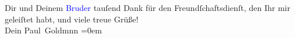 \pstart
           Dir und Deinem \textcolor{blue}{Bruder}{}\ledrightnote{\textcolor{blue}{Julius Schnitzler}} tauſend Dank für
               den Freundſchaftsdienſt, den Ihr mir geleiſtet habt, und viele treue Grüße! {\\[\baselineskip]}Dein
                  \spacefill\mbox{Paul Goldmnn}\pend
           \leftskip=0em{}\endnumbering{}  
      
